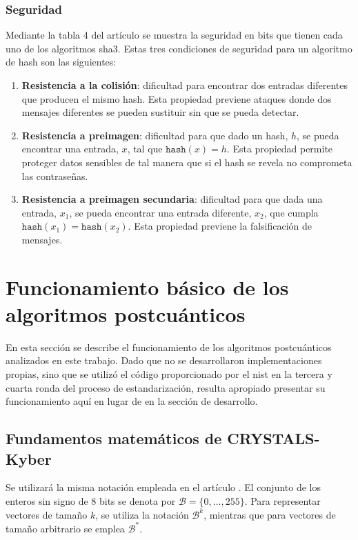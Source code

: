 \subsubsection{Seguridad}
Mediante la tabla 4 del artículo \cite{FIPS202} se muestra la seguridad en bits que tienen cada uno de los algoritmos \acrshort{sha}3. Estas tres condiciones de seguridad para un algoritmo de hash son las siguientes:
\begin{enumerate}
	\item \textbf{Resistencia a la colisión}: dificultad para encontrar dos entradas diferentes que producen el mismo hash. Esta propiedad previene ataques donde dos mensajes diferentes se pueden sustituir sin que se pueda detectar.
	\item \textbf{Resistencia a preimagen}: dificultad para que dado un hash, \(h\), se pueda encontrar una entrada, \(x\), tal que \(\texttt{hash}(x)=h\). Esta propiedad permite proteger datos sensibles de tal manera que si el hash se revela no comprometa las contraseñas. 
	\item \textbf{Resistencia a preimagen secundaria}: dificultad para que dada una entrada, \(x_1\), se pueda encontrar una entrada diferente, \(x_2\), que cumpla \(\texttt{hash}(x_1)=\texttt{hash}(x_2)\). Esta propiedad previene la falsificación de mensajes.
\end{enumerate}
\newpage



\section{Funcionamiento básico de los algoritmos postcuánticos}
En esta sección se describe el funcionamiento de los algoritmos postcuánticos analizados en este trabajo. Dado que no se desarrollaron implementaciones propias, sino que se utilizó el código proporcionado por el \acrshort{nist} en la tercera \cite{nistPQCround3} y cuarta \cite{nistPQCround4} ronda del proceso de estandarización, resulta apropiado presentar su funcionamiento aquí en lugar de en la sección de desarrollo.
\subsection{Fundamentos matemáticos de CRYSTALS-Kyber }
Se utilizará la misma notación empleada en el artículo \cite{kyber-spec-2021}. El conjunto de los enteros sin signo de 8 bits se denota por \(\mathcal{B} = \{0, \dots, 255\}\). Para representar vectores de tamaño \(k\), se utiliza la notación \(\mathcal{B}^k\), mientras que para vectores de tamaño arbitrario se emplea \(\mathcal{B}^*\).
\newline

